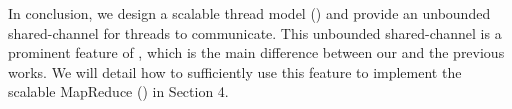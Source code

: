 




In conclusion, we design a scalable thread model (\myth) and provide an unbounded shared-channel for threads to communicate. This unbounded shared-channel is a prominent feature of \myth, which is the main difference between our \myth and the previous works. 
We will detail how to sufficiently use this feature to implement the scalable MapReduce (\myds)  in Section 4.








